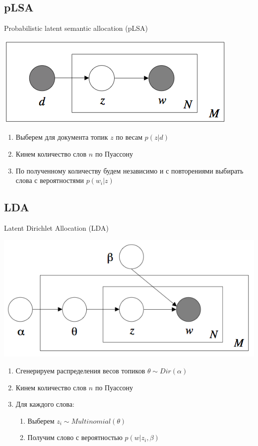 \documentclass[14pt, fleqn, xcolor={dvipsnames, table}]{beamer}
\begin{document}
\subsection{pLSA}
\begin{frame}{Probabilistic latent semantic allocation (pLSA)}
\begin{center}
\includegraphics[height=0.3\textheight]{pLSA.png}
\end{center}
\begin{enumerate}
  \item Выберем для документа топик $z$ по весам $p(z|d)$
  \item Кинем количество слов $n$ по Пуассону
  \item По полученному количеству будем независимо и с повторениями выбирать слова с вероятностями $p(w_i|z)$
\end{enumerate}
\end{frame}

\subsection{LDA}
\begin{frame}{Latent Dirichlet Allocation (LDA)}
\begin{center}
\includegraphics[height=0.3\textheight]{LDA.png}
\end{center}
\begin{enumerate}
  \item Сгенерируем распределения весов топиков $\theta \sim Dir(\alpha)$
  \item Кинем количество слов $n$ по Пуассону
  \item Для каждого слова:
  \begin{enumerate}
    \item Выберем $z_i \sim Multinomial(\theta)$
    \item Получим слово с вероятностью $p(w|z_i,\beta)$
  \end{enumerate}
\end{enumerate}
\end{frame}
\end{document}
